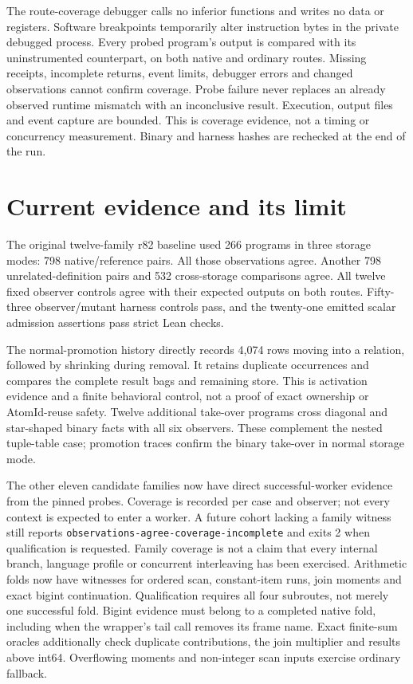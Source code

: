 \documentclass[11pt,a4paper]{article}
\newcommand{\code}[1]{\nolinkurl{#1}}
\begin{document}
The route-coverage debugger calls no inferior functions and writes no data or registers.
Software breakpoints temporarily alter instruction bytes in the private
debugged process. Every probed program's output is compared with its
uninstrumented counterpart, on both native and ordinary routes. Missing
receipts, incomplete returns, event limits, debugger errors and changed
observations cannot confirm coverage. Probe failure never replaces an already
observed runtime mismatch with an inconclusive result. Execution, output files and event
capture are bounded. This is coverage evidence, not a timing or concurrency
measurement. Binary and harness hashes are rechecked at the end of the run.

\section{Current evidence and its limit}

The original twelve-family r82 baseline used 266 programs in three storage
modes: 798 native/reference pairs. All those observations agree. Another
798 unrelated-definition pairs and 532 cross-storage comparisons agree.
All twelve fixed observer controls agree with their expected outputs on both
routes. Fifty-three observer/mutant harness controls pass, and the twenty-one emitted
scalar admission assertions pass strict Lean checks.

The normal-promotion history directly records 4,074 rows moving into a relation,
followed by shrinking during removal. It retains duplicate occurrences and
compares the complete result bags and remaining store. This is activation
evidence and a finite behavioral control, not a proof of exact ownership or
AtomId-reuse safety.
Twelve additional take-over programs cross diagonal and star-shaped binary
facts with all six observers. These complement the nested tuple-table case;
promotion traces confirm the binary take-over in normal storage mode.

The other eleven candidate families now have direct successful-worker
evidence from the pinned probes. Coverage is recorded per case and observer;
not every context is expected to enter a worker. A future cohort lacking a
family witness still reports \code{observations-agree-coverage-incomplete}
and exits 2 when qualification is requested. Family coverage is not a claim
that every internal branch, language profile or concurrent interleaving has
been exercised. Arithmetic folds now have witnesses for ordered scan,
constant-item runs, join moments and exact bigint continuation. Qualification
requires all four subroutes, not merely one successful fold. Bigint evidence
must belong to a completed native fold, including when the wrapper's tail
call removes its frame name. Exact finite-sum oracles additionally check
duplicate contributions, the join multiplier and results above int64.
Overflowing moments and non-integer scan inputs exercise ordinary fallback.
\end{document}
